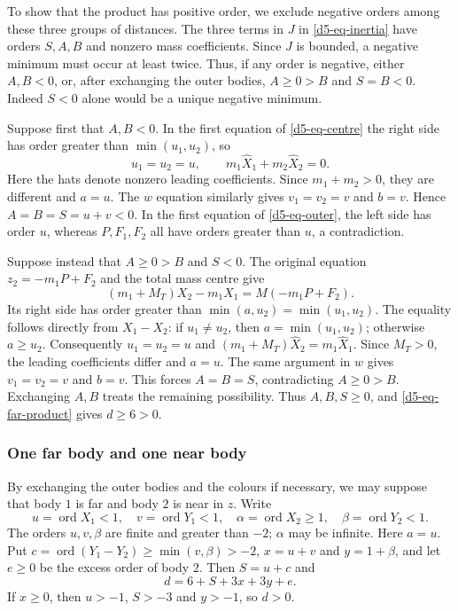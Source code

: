 \documentclass[Threeside,11pt]{article}
\theoremstyle{definition}
\theoremstyle{remark}
\numberwithin{equation}{section}
\theoremstyle{remark}
\newcommand{\ord}{\operatorname{ord}}
\begin{document}
{To show that the product has positive order, we exclude negative orders
among these three groups of distances.  The three terms in $J$ in
\eqref{d5-eq-inertia} have orders $S,A,B$ and nonzero mass coefficients.
Since $J$ is bounded, a negative minimum must occur at least twice.
Thus, if any order is negative, either
$A,B<0$, or, after exchanging the outer bodies, $A\ge0>B$ and $S=B<0$.
Indeed $S<0$ alone would be a unique negative minimum.

Suppose first that $A,B<0$.  In the first equation of \eqref{d5-eq-centre} the
right side has order greater than $\min(u_1,u_2)$, so
\[
 u_1=u_2=u,\qquad m_1\widehat X_1+m_2\widehat X_2=0.
\]
Here the hats denote nonzero leading coefficients.  Since $m_1+m_2>0$, they
are different and $a=u$.  The $w$ equation similarly gives $v_1=v_2=v$ and
$b=v$.  Hence $A=B=S=u+v<0$.  In the first equation of
\eqref{d5-eq-outer}, the left side has order $u$, whereas $P,F_1,F_2$ all have
orders greater than $u$, a contradiction.

Suppose instead that $A\ge0>B$ and $S<0$.  The original equation
$z_2=-m_1P+F_2$ and the total mass centre give
\[
 (m_1+M_T)X_2-m_1X_1=M(-m_1P+F_2).
\]
Its right side has order greater than
$\min(a,u_2)=\min(u_1,u_2)$.  The equality follows directly from
$X_1-X_2$: if $u_1\ne u_2$, then $a=\min(u_1,u_2)$; otherwise $a\ge u_2$.
Consequently $u_1=u_2=u$ and
$(m_1+M_T)\widehat X_2=m_1\widehat X_1$.  Since $M_T>0$, the leading
coefficients differ and $a=u$.  The same argument in $w$ gives
$v_1=v_2=v$ and $b=v$.  This forces $A=B=S$, contradicting $A\ge0>B$.
Exchanging $A,B$ treats the remaining possibility.
Thus $A,B,S\ge0$, and \eqref{d5-eq-far-product} gives $d\ge6>0$.

\subsubsection{One far body and one near body}\label{d5-far-near}
By exchanging the outer bodies and the colours if necessary, we may suppose
that body $1$ is far and body $2$ is near in
$z$.  Write
\[
 u=\ord X_1<1,\quad v=\ord Y_1<1,\quad
 \alpha=\ord X_2\ge1,\quad \beta=\ord Y_2<1.
\]
The orders $u,v,\beta$ are finite and greater than $-2$; $\alpha$ may be infinite.
Here $a=u$.  Put $c=\ord(Y_1-Y_2)\ge\min(v,\beta)>-2$,
$x=u+v$ and $y=1+\beta$, and let $e\ge0$ be the excess order of body $2$.
Then $S=u+c$ and
\begin{equation}\label{d5-eq-mixed-product}
 d=6+S+3x+3y+e.
\end{equation}
If $x\ge0$, then $u>-1$, $S>-3$ and $y>-1$, so $d>0$.

}
\end{document}
